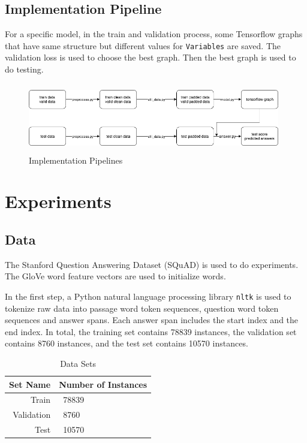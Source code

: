 \documentclass[modernstyle,12pt]{sjsuthesis}
\theoremstyle{definition}
\begin{document}
\section{Implementation Pipeline}

For a specific model, in the train and validation process, some Tensorflow graphs that have same structure but different values for {\tt Variables} are saved. The validation loss is used to choose the best graph. Then the best graph is used to do testing.

\begin{figure}[htbp]\centering
  \includegraphics[width=11cm, height=3cm]{figures/pipeline.png}
  \caption{Implementation Pipelines}
  \label{f:pipeline}
\end{figure}


\chapter{Experiments}
\section{Data}
The Stanford Question Answering Dataset (SQuAD) is used to do experiments. The GloVe word feature vectors\cite{pennington2014glove} are used to initialize words.

In the first step, a Python natural language processing library {\tt nltk} is used to tokenize raw data into passage word token sequences, question word token sequences and answer spans. Each answer span includes the start index and the end index. In total, the training set contains 78839 instances, the validation set contains 8760 instances, and the test set contains 10570 instances.

\begin{table}[htbp]\centering
  \caption{Data Sets}
  \label{tab:dataset}
  \begin{tabular}{|r|l|} \hline
    Set Name & Number of Instances \\ \hline\hline
    Train & \ 78839 \\
    Validation & \ 8760 \\
    Test & \ 10570 \\ \hline
  \end{tabular}
\end{table}
\end{document}
